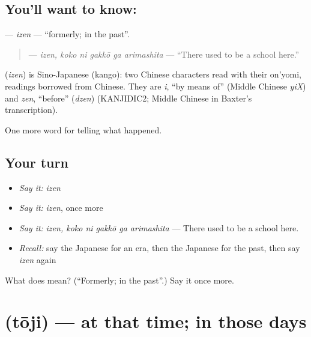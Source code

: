 \subsection*{You'll want to know: }
\textbf{} — \emph{izen} — \textquotedblleft{}formerly; in the past\textquotedblright{}.

\begin{quote}
\textbf{  } — \emph{izen, koko ni gakkō ga arimashita} — \textquotedblleft{}There used to be a school here.\textquotedblright{}
\end{quote}

\begin{cousinweb}
\textbf{} (\emph{izen}) is Sino-Japanese (kango): two Chinese characters read with their on'yomi, readings borrowed from Chinese. They are \emph{i}, \textquotedblleft{}by means of\textquotedblright{} (Middle Chinese \emph{yiX}) and \emph{zen}, \textquotedblleft{}before\textquotedblright{} (\emph{dzen}) (KANJIDIC2; Middle Chinese in Baxter's transcription).
\end{cousinweb}

\begin{grammarlens}[title={What you've built}]
One more word for telling what happened.
\end{grammarlens}

\subsection*{Your turn}
\begin{itemize}
\raggedright
  \item \emph{Say it:} \emph{izen}
  \item \emph{Say it:} \emph{izen}, once more
  \item \emph{Say it:} \emph{izen, koko ni gakkō ga arimashita} — There used to be a school here.
  \item \emph{Recall:} say the Japanese for an era, then the Japanese for the past, then say \emph{izen} again
\end{itemize}

\begin{tcolorbox}[breakable,colback=teal!4,colframe=teal!35!black,title={Before you move on}]
What does  mean? (\textquotedblleft{}Formerly; in the past\textquotedblright{}.) Say it once more.
\end{tcolorbox}
\section[\texorpdfstring{\ja{とうじ} (tōji)}{とうじ (tōji)}]{ (tōji) — at that time; in those days}

